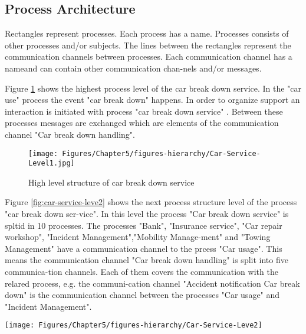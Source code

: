 \subsection{Process Architecture}

Rectangles represent processes. Each process has a name. Processes consists of other processes and/or subjects. The lines between the rectangles represent the communication channels between processes. Each communication channel has a nameand can contain other communication chan-nels and/or messages.

Figure \ref{fig:car-service-level1} shows the highest process level of the car break down service. In the "car use" process the event "car break down" happens. In order to organize support an interaction is initiated with process "car break down service" . Between these processes messages are exchanged which are elements of the communication channel "Car break down handling".\\


\begin{figure}[htbp]
	\centering
	\texttt{[image: Figures/Chapter5/figures-hierarchy/Car-Service-Level1.jpg]}
	\caption[High level structure of car break down service]{High level structure of car break down service}
	\label{fig:car-service-level1}
\end{figure}



Figure \ref{fig:car-service-leve2} shows the next process structure level of the process "car break down ser-vice". In this level the process "Car break down service" is spltid in 10 processes. The processes "Bank", "Insurance service", "Car repair workshop", "Incident Management","Mobility Manage-ment" and "Towing Management" have a communication channel to the prcess "Car usage". This means the communication channel "Car break down handling" is split into five communica-tion channels. Each of them covers the communication with the relared process, e.g. the communi-cation channel "Accident notification Car break down" is the communication channel between the processes "Car usage" and "Incident Management".\\


\begin{figure*}[htbp]
	\centering
	\texttt{[image: Figures/Chapter5/figures-hierarchy/Car-Service-Leve2]}
	\caption[Structure of the Emmergency Call Handling Process]{Structure of the Emmergency Call Handling Process}
	\label{fig:car-service-leve2}
\end{figure*}



